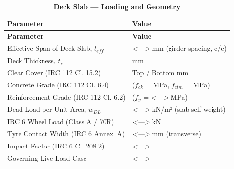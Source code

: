 \documentclass[12pt,a4paper]{report}
\numberwithin{table}{chapter}
\numberwithin{figure}{chapter}
\newcommand{\reportrowpad}{4pt}
\newcommand{\reportsectiongap}{0.75em}
\newcommand{\placeholder}[1]{\textit{\textless #1\textgreater}}
\begin{document}
\vspace{\reportsectiongap}
\begin{longtable}{|L{5.5cm}|p{10.0cm}|}
\caption{\textbf{Deck Slab --- Loading and Geometry}}\\
\hline
\textbf{Parameter} & \textbf{Value} \\
\hline
\endfirsthead
\hline
\textbf{Parameter} & \textbf{Value} \\
\hline
\endhead
\textnormal{Effective Span of Deck Slab, $l_{eff}$} & \placeholder{---} mm (girder spacing, c/c) \\[\reportrowpad]
\hline
\textnormal{Deck Thickness, $t_s$} &  mm \\[\reportrowpad]
\hline
\textnormal{Clear Cover (IRC 112 Cl. 15.2)} & Top  / Bottom  mm \\[\reportrowpad]
\hline
\textnormal{Concrete Grade (IRC 112 Cl. 6.4)} &  ($f_{ck}$ =  MPa, $f_{ctm}$ =  MPa) \\[\reportrowpad]
\hline
\textnormal{Reinforcement Grade (IRC 112 Cl. 6.2)} &  ($f_y$ = \placeholder{---} MPa) \\[\reportrowpad]
\hline
\textnormal{Dead Load per Unit Area, $w_{DL}$} & \placeholder{---} kN/m² (slab self-weight) \\[\reportrowpad]
\hline
\textnormal{IRC 6 Wheel Load (Class A / 70R)} & \placeholder{---} kN \\[\reportrowpad]
\hline
\textnormal{Tyre Contact Width (IRC 6 Annex~A)} & \placeholder{---} mm (transverse) \\[\reportrowpad]
\hline
\textnormal{Impact Factor (IRC 6 Cl. 208.2)} & \placeholder{---} \\[\reportrowpad]
\hline
\textnormal{Governing Live Load Case} & \placeholder{---} \\[\reportrowpad]
\hline
\end{longtable}
\end{document}
